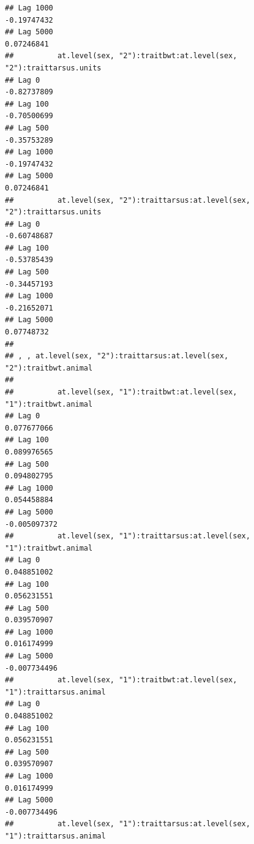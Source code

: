 \documentclass[
  12pt,
]{book}
\begin{document}
\begin{verbatim}
## Lag 1000                                                      -0.19747432
## Lag 5000                                                       0.07246841
##          at.level(sex, "2"):traitbwt:at.level(sex, "2"):traittarsus.units
## Lag 0                                                         -0.82737809
## Lag 100                                                       -0.70500699
## Lag 500                                                       -0.35753289
## Lag 1000                                                      -0.19747432
## Lag 5000                                                       0.07246841
##          at.level(sex, "2"):traittarsus:at.level(sex, "2"):traittarsus.units
## Lag 0                                                            -0.60748687
## Lag 100                                                          -0.53785439
## Lag 500                                                          -0.34457193
## Lag 1000                                                         -0.21652071
## Lag 5000                                                          0.07748732
## 
## , , at.level(sex, "2"):traittarsus:at.level(sex, "2"):traitbwt.animal
## 
##          at.level(sex, "1"):traitbwt:at.level(sex, "1"):traitbwt.animal
## Lag 0                                                       0.077677066
## Lag 100                                                     0.089976565
## Lag 500                                                     0.094802795
## Lag 1000                                                    0.054458884
## Lag 5000                                                   -0.005097372
##          at.level(sex, "1"):traittarsus:at.level(sex, "1"):traitbwt.animal
## Lag 0                                                          0.048851002
## Lag 100                                                        0.056231551
## Lag 500                                                        0.039570907
## Lag 1000                                                       0.016174999
## Lag 5000                                                      -0.007734496
##          at.level(sex, "1"):traitbwt:at.level(sex, "1"):traittarsus.animal
## Lag 0                                                          0.048851002
## Lag 100                                                        0.056231551
## Lag 500                                                        0.039570907
## Lag 1000                                                       0.016174999
## Lag 5000                                                      -0.007734496
##          at.level(sex, "1"):traittarsus:at.level(sex, "1"):traittarsus.animal

\end{verbatim}
\end{document}
